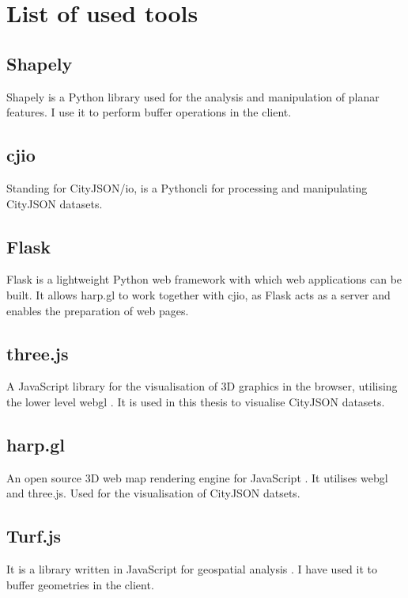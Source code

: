 

\chapter{List of used tools}
\label{ch:tools}

\section{Shapely}
\label{tools:shapely}
Shapely \citep{Shapely2020} is a Python library used for the analysis and manipulation of planar features.
I use it to perform buffer operations in the client.

\section{cjio}
\label{tools:cjio}
Standing for CityJSON/io, \citep{cjio} is a Python\ac{cli} for processing and manipulating CityJSON datasets.

\section{Flask}
\label{tools:flask}
Flask \citep{Flask2020} is a lightweight Python web framework with which web applications can be built. 
It allows harp.gl to work together with cjio, as Flask acts as a server and enables the preparation of web pages.

\section{three.js}
\label{tools:threejs}
A JavaScript library for the visualisation of 3D graphics in the browser, utilising the lower level \ac{webgl} \citep{Three.js2020}.
It is used in this thesis to visualise CityJSON datasets.

\section{harp.gl}
\label{tools:harpgl}
An open source 3D web map rendering engine for JavaScript \citep{harpgl}.
It utilises \ac{webgl} and three.js.
Used for the visualisation of CityJSON datsets.

\section{Turf.js}
\label{tools:turfjs}
It is a library written in JavaScript for geospatial analysis \citep{Turf.js2020}.
I have used it to buffer geometries in the client.

